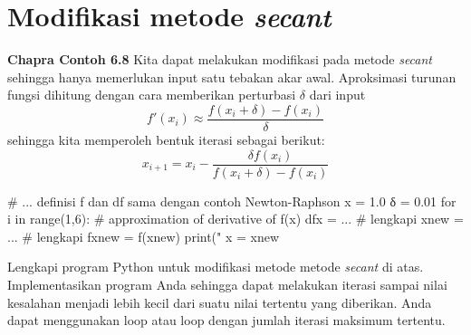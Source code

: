 \section{Modifikasi metode \textit{secant}}

\textbf{Chapra Contoh 6.8}
Kita dapat melakukan modifikasi pada metode
\textit{secant} sehingga hanya
memerlukan input satu tebakan akar awal. Aproksimasi turunan fungsi
dihitung dengan cara memberikan perturbasi $\delta$ dari input
\begin{equation*}
f'(x_{i}) \approx \frac{f(x_{i}+\delta) - f(x_{i})}{\delta}
\end{equation*}
sehingga kita memperoleh bentuk iterasi sebagai berikut:
\begin{equation}
x_{i+1} = x_{i} - \frac{\delta f(x_{i})}{f(x_{i}+\delta) - f(x_{i})}
\end{equation}

\begin{pythoncode}
# ... definisi f dan df sama dengan contoh Newton-Raphson
x = 1.0
δ = 0.01
for i in range(1,6):
    # approximation of derivative of f(x)
    dfx = ... # lengkapi
    xnew = ... # lengkapi
    fxnew = f(xnew)
    print("%
    x = xnew    
\end{pythoncode}

\begin{soal}
Lengkapi program Python untuk modifikasi metode metode \textit{secant} di atas.
Implementasikan program Anda sehingga
dapat melakukan iterasi sampai nilai kesalahan menjadi lebih kecil dari
suatu nilai tertentu yang diberikan. Anda dapat menggunakan loop 
atau loop  dengan jumlah iterasi maksimum tertentu.
\end{soal}